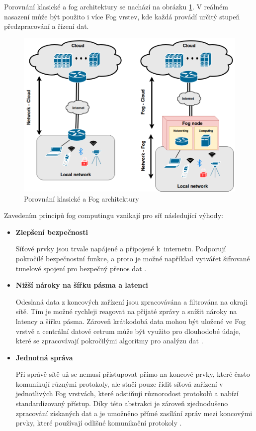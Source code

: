  Porovnání klasické a fog architektury se nachází na obrázku \ref{obr.fog}. V reálném nasazení může
 být použito i více Fog vrstev, kde každá provádí určitý stupeň předzpracování a řízení
 dat.
\begin{figure}[ht]
\begin{center}
\includegraphics[scale=0.38]{pictures/fog}
\caption{Porovnání klasické a Fog architektury}
\label{obr.fog}
\end{center}
\end{figure}
 Zavedením principů fog computingu vznikají pro síť následující výhody:
 \begin{itemize}
 \item \textbf{Zlepšení bezpečnosti} 
 
     Síťové prvky jsou trvale napájené a připojené k internetu. Podporují pokročilé
     bezpečnostní funkce, a proto je možné například vytvářet šifrované tunelové
     spojení pro bezpečný přenos dat \cite{fog}.     
\item \textbf{Nižší nároky na šířku pásma a latenci} 

    Odeslaná data z koncových zařízení jsou zpracovávána a filtrována na okraji 
    sítě. Tím je možné rychleji reagovat na přijaté zprávy a snížit nároky
    na latency a šířku pásma. Zároveň krátkodobá data mohou být uložené ve 
    Fog vrstvě a centrální datové cetrum může být využito pro dlouhodobé údaje, 
    které se zpracovávají pokročilými algoritmy pro analýzu dat \cite{fog}.
 \item \textbf{Jednotná správa} 
 
    Při správě sítě už se nemusí přistupovat přímo na koncové prvky, které 
    často komunikují různými protokoly, ale stačí pouze
    řídit síťová zařízení v jednotlivých Fog vrstvách, které odstiňují různorodost
    protokolů a nabízí standardizovaný přístup. Díky této abstrakci je 
    zároveň zjednodušeno zpracování získaných dat a je umožněno přímé zasílání zpráv
    mezi koncovými prvky, které používají odlišné komunikační protokoly \cite{fog}.
 \end{itemize} 
 
